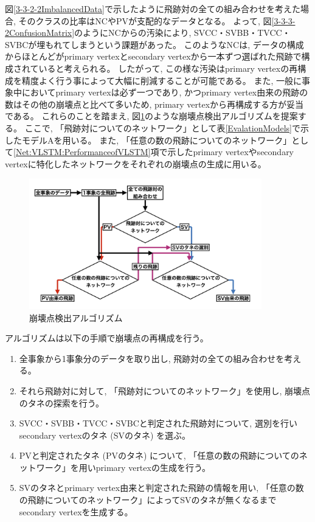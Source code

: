 図\ref{3-3-2-2ImbalancedData}で示したように飛跡対の全ての組み合わせを考えた場合, そのクラスの比率はNCやPVが支配的なデータとなる。
よって, 図\ref{3-3-3-2ConfusionMatrix}のようにNCからの汚染により, SVCC・SVBB・TVCC・SVBCが埋もれてしまうという課題があった。
このようなNCは, データの構成からほとんどがprimary vertexとsecondary vertexから一本ずつ選ばれた飛跡で構成されていると考えられる。
したがって, この様な汚染はprimary vertexの再構成を精度よく行う事によって大幅に削減することが可能である。
また, 一般に事象中においてprimary vertexは必ず一つであり, かつprimary vertex由来の飛跡の数はその他の崩壊点と比べて多いため, primary vertexから再構成する方が妥当である。
これらのことを踏まえ, 図\ref{4-1-0-1VertexFinderAlgorithm}のような崩壊点検出アルゴリズムを提案する。
ここで, 「飛跡対についてのネットワーク」として表\ref{EvalationModels}で示したモデルAを用いる。
また, 「任意の数の飛跡についてのネットワーク」として\ref{Net:VLSTM:PerformanceofVLSTM}項で示したprimary vertexやsecondary vertexに特化したネットワークをそれぞれの崩壊点の生成に用いる。

\begin{figure}[htbp]
 \centering
 \includegraphics[width=0.9\textwidth, clip]{Figure/4VertexFinderwithDL/4-1-0-1VertexFinderAlgorithm.png}
 \caption{崩壊点検出アルゴリズム}
 \label{4-1-0-1VertexFinderAlgorithm}
\end{figure}

アルゴリズムは以下の手順で崩壊点の再構成を行う。

\begin{enumerate}
 \item 全事象から1事象分のデータを取り出し, 飛跡対の全ての組み合わせを考える。
 \item それら飛跡対に対して, 「飛跡対についてのネットワーク」を使用し, 崩壊点のタネの探索を行う。
 \item SVCC・SVBB・TVCC・SVBCと判定された飛跡対について, 選別を行いsecondary vertexのタネ (SVのタネ) を選ぶ。
 \item PVと判定されたタネ (PVのタネ) について, 「任意の数の飛跡についてのネットワーク」を用いprimary vertexの生成を行う。
 \item SVのタネとprimary vertex由来と判定された飛跡の情報を用い, 「任意の数の飛跡についてのネットワーク」によってSVのタネが無くなるまでsecondary vertexを生成する。
\end{enumerate}

